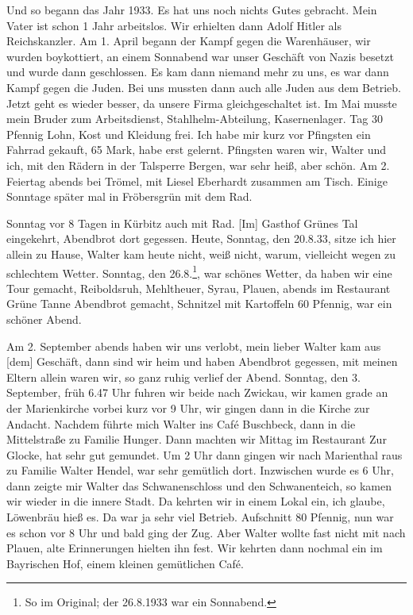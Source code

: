 \documentclass[a5paper,11pt,openany]{book}
\newcommand{\seite}[1]{\leavevmode\marginpar{\footnotesize\itshape\raggedright #1}\ignorespaces}
\newcommand{\jahr}[1]{\par\medskip\noindent{\scshape #1}\par\nopagebreak}
\begin{document}
Und so begann das Jahr 1933.
Es hat uns noch nichts Gutes gebracht.
Mein Vater ist schon 1 Jahr arbeitslos.
Wir erhielten dann Adolf Hitler als Reichskanzler.
Am 1. April begann der Kampf gegen die Warenhäuser, wir wurden boykottiert,
  an einem Sonnabend war unser Geschäft von Nazis besetzt und wurde dann geschlossen.
Es kam dann niemand mehr zu uns, es war dann Kampf gegen die Juden.
Bei uns mussten dann auch alle Juden aus dem Betrieb.
Jetzt geht es wieder besser, da
\seite{21}
unsere Firma gleichgeschaltet ist.
Im Mai musste mein Bruder zum Arbeitsdienst, Stahlhelm-Abteilung, Kasernenlager.
Tag 30 Pfennig Lohn, Kost und Kleidung frei.
Ich habe mir kurz vor Pfingsten ein Fahrrad gekauft, 65 Mark, habe erst gelernt.
Pfingsten waren wir, Walter und ich, mit den Rädern in der Talsperre Bergen, war sehr heiß, aber schön.
Am 2. Feiertag abends bei Trömel, mit Liesel Eberhardt zusammen am Tisch.
Einige Sonntage später mal in Fröbersgrün mit dem Rad.

\seite{22}
Sonntag vor 8 Tagen in Kürbitz auch mit Rad.
[Im] Gasthof Grünes Tal eingekehrt, Abendbrot dort gegessen.
Heute, Sonntag, den 20.8.33, sitze ich hier allein zu Hause,
  Walter kam heute nicht, weiß nicht, warum, vielleicht wegen zu schlechtem Wetter.
Sonntag, den 26.8.\footnote{So im Original; der 26.8.1933 war ein Sonnabend.}, war schönes Wetter, da haben wir eine Tour gemacht, Reiboldsruh, Mehltheuer, Syrau, Plauen,
  abends im Restaurant Grüne Tanne Abendbrot gemacht, Schnitzel mit Kartoffeln 60 Pfennig, war ein schöner Abend.

\jahr{1933.}
\seite{23}
Am 2. September abends haben wir uns verlobt,
  mein lieber Walter kam aus [dem] Geschäft, dann sind wir heim und haben Abendbrot gegessen,
  mit meinen Eltern allein waren wir, so ganz ruhig verlief der Abend.
Sonntag, den 3. September, früh 6.47 Uhr fuhren wir beide nach Zwickau, wir kamen grade an der Marienkirche vorbei kurz vor 9 Uhr,
  wir gingen dann in die Kirche zur Andacht.
Nachdem führte mich Walter ins Café Buschbeck, dann in die Mittelstraße zu Familie Hunger.
Dann machten wir Mittag im Restaurant Zur Glocke, hat sehr gut gemundet.
Um 2 Uhr dann
\seite{24}
gingen wir nach Marienthal raus zu Familie Walter Hendel, war sehr gemütlich dort.
Inzwischen wurde es 6 Uhr, dann zeigte mir Walter das Schwanenschloss und den Schwanenteich, so kamen wir wieder in die innere Stadt.
Da kehrten wir in einem Lokal ein, ich glaube, Löwenbräu hieß es.
Da war ja sehr viel Betrieb.
Aufschnitt 80 Pfennig, nun war es schon vor 8 Uhr und bald ging der Zug.
Aber Walter wollte fast nicht mit nach Plauen, alte Erinnerungen hielten ihn fest.
Wir kehrten dann nochmal ein im Bayrischen Hof, einem kleinen gemütlichen Café.
\end{document}
